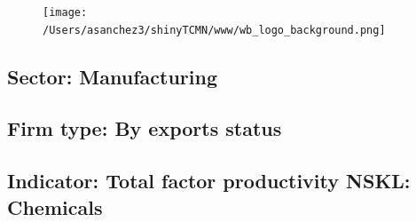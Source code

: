 \documentclass{article}\usepackage[]{graphicx}\usepackage[]{color}
\begin{document}
%

\begin{figure}
  \vspace{-3ex} %
  \hspace{-7ex} %
  \texttt{[image: /Users/asanchez3/shinyTCMN/www/wb\_logo\_background.png]}
\end{figure}
 \begin{minipage}[t]{1.1\textwidth} %
      \vspace{-30ex}
      \hspace{10ex}
  \end{minipage}
  
%
\begin{minipage}[t]{0.99\textwidth} %
  \vspace{-0.5cm}
      \subsection*{\color{white!40!black}Sector: \color{blue!40!black}Manufacturing}
      \subsection*{\color{white!40!black}Firm type: \color{blue!40!black}By exports status}
      \subsection*{\color{white!40!black}Indicator: \color{blue!40!black}Total factor productivity NSKL: Chemicals}
  \end{minipage} %
\end{document}
